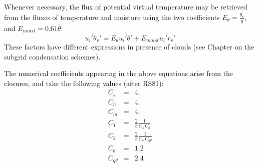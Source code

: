Whenever necessary, the flux of potential virtual temperature may be
retrieved from the
fluxes of temperature and moisture using the two coefficients $E_{\theta}=
\frac{\overline{\theta_v}}{\overline{\theta}}$,
and $E_{moist}=0.61\overline{\theta}$:
\begin{equation}
\overline{u_i'\theta_v'}= E_{\theta} \overline{u_i'\theta'} + E_{moist}
\overline{u_i'r_v'}
\end{equation}
These factors have different expressions in presence of clouds
(see Chapter on the subgrid condensation schemes).


The numerical coefficients appearing in the above equations arise from the
closures, and take the following values (after RS81):
\begin{eqnarray}
C_s&=&4. \\
C_h&=&4. \\
C_m&=&4. \\
C_1&=& \frac{2}{3} \frac{1}{C_s\,C_{\theta}}\\
C_2&=& \frac{2}{3} \frac{1}{C_s\,C_{q\theta}}\\
C_{\theta}&=&1.2 \\
C_{q\theta}&=& 2.4
\end{eqnarray}

